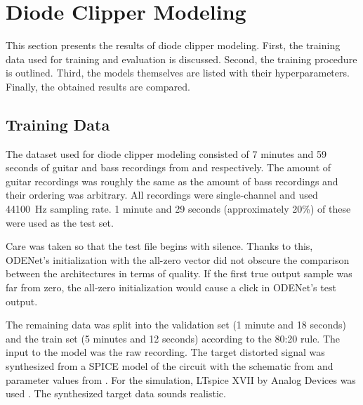 
\section{Diode Clipper Modeling}
\label{chap:diode_clipper}

This section presents the results of diode clipper modeling. First, the training data used for training and evaluation is discussed. Second, the training procedure is outlined. Third, the models themselves are listed with their hyperparameters. Finally, the obtained results are compared.

\subsection{Training Data}
\label{sec:diode_clipper_training_data}

The dataset used for diode clipper modeling consisted of 7 minutes and 59 seconds of guitar and bass recordings from \cite{Abesser2013} and \cite{Kehling2014} respectively. The amount of guitar recordings was roughly the same as the amount of bass recordings and their ordering was arbitrary. All recordings were single-channel and used \SI{44100}{Hz} sampling rate. 1 minute and 29 seconds (approximately 20\%) of these were used as the test set. 

Care was taken so that the test file begins with silence. Thanks to this, ODENet's initialization with the all-zero vector did not obscure the comparison between the architectures in terms of quality. If the first true output sample was far from zero, the all-zero initialization would cause a click in ODENet's test output. 

The remaining data was split into the validation set (1 minute and 18 seconds) and the train set (5 minutes and 12 seconds) according to the 80:20 rule. The input to the model was the raw recording. The target distorted signal was synthesized from a SPICE model of the circuit with the schematic from  and parameter values from . For the simulation, LTspice XVII by Analog Devices was used \cite{LTspice}. The synthesized target data sounds realistic.

